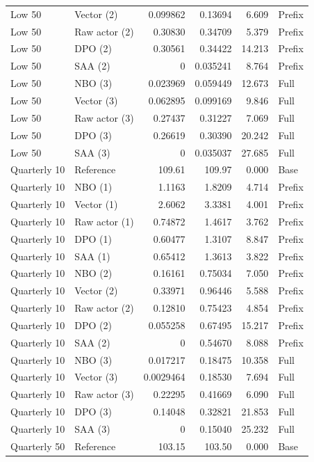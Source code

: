 \begin{longtable}{llrrrl}
Low 50 & Vector (2) & 0.099862 & 0.13694 & 6.609 & Prefix\\
Low 50 & Raw actor (2) & 0.30830 & 0.34709 & 5.379 & Prefix\\
Low 50 & DPO (2) & 0.30561 & 0.34422 & 14.213 & Prefix\\
Low 50 & SAA (2) & 0 & 0.035241 & 8.764 & Prefix\\
Low 50 & NBO (3) & 0.023969 & 0.059449 & 12.673 & Full\\
Low 50 & Vector (3) & 0.062895 & 0.099169 & 9.846 & Full\\
Low 50 & Raw actor (3) & 0.27437 & 0.31227 & 7.069 & Full\\
Low 50 & DPO (3) & 0.26619 & 0.30390 & 20.242 & Full\\
Low 50 & SAA (3) & 0 & 0.035037 & 27.685 & Full\\
\addlinespace
Quarterly 10 & Reference & 109.61 & 109.97 & 0.000 & Base\\
Quarterly 10 & NBO (1) & 1.1163 & 1.8209 & 4.714 & Prefix\\
Quarterly 10 & Vector (1) & 2.6062 & 3.3381 & 4.001 & Prefix\\
Quarterly 10 & Raw actor (1) & 0.74872 & 1.4617 & 3.762 & Prefix\\
Quarterly 10 & DPO (1) & 0.60477 & 1.3107 & 8.847 & Prefix\\
Quarterly 10 & SAA (1) & 0.65412 & 1.3613 & 3.822 & Prefix\\
Quarterly 10 & NBO (2) & 0.16161 & 0.75034 & 7.050 & Prefix\\
Quarterly 10 & Vector (2) & 0.33971 & 0.96446 & 5.588 & Prefix\\
Quarterly 10 & Raw actor (2) & 0.12810 & 0.75423 & 4.854 & Prefix\\
Quarterly 10 & DPO (2) & 0.055258 & 0.67495 & 15.217 & Prefix\\
Quarterly 10 & SAA (2) & 0 & 0.54670 & 8.088 & Prefix\\
Quarterly 10 & NBO (3) & 0.017217 & 0.18475 & 10.358 & Full\\
Quarterly 10 & Vector (3) & 0.0029464 & 0.18530 & 7.694 & Full\\
Quarterly 10 & Raw actor (3) & 0.22295 & 0.41669 & 6.090 & Full\\
Quarterly 10 & DPO (3) & 0.14048 & 0.32821 & 21.853 & Full\\
Quarterly 10 & SAA (3) & 0 & 0.15040 & 25.232 & Full\\
\addlinespace
Quarterly 50 & Reference & 103.15 & 103.50 & 0.000 & Base\\

\end{longtable}
